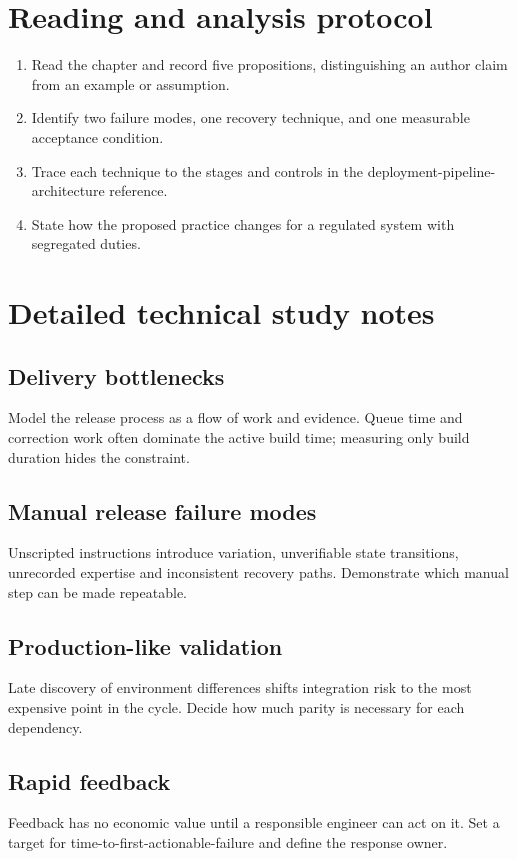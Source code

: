\documentclass[10pt,letterpaper]{article}
\begin{document}
\section{Reading and analysis protocol}
\begin{enumerate}
\item Read the chapter and record five propositions, distinguishing an author claim from an example or assumption.
\item Identify two failure modes, one recovery technique, and one measurable acceptance condition.
\item Trace each technique to the stages and controls in the deployment-pipeline-architecture reference.
\item State how the proposed practice changes for a regulated system with segregated duties.
\end{enumerate}

\section{Detailed technical study notes}
\subsection{Delivery bottlenecks}
Model the release process as a flow of work and evidence. Queue time and correction work often dominate the active build time; measuring only build duration hides the constraint.

\subsection{Manual release failure modes}
Unscripted instructions introduce variation, unverifiable state transitions, unrecorded expertise and inconsistent recovery paths. Demonstrate which manual step can be made repeatable.

\subsection{Production-like validation}
Late discovery of environment differences shifts integration risk to the most expensive point in the cycle. Decide how much parity is necessary for each dependency.

\subsection{Rapid feedback}
Feedback has no economic value until a responsible engineer can act on it. Set a target for time-to-first-actionable-failure and define the response owner.
\end{document}
